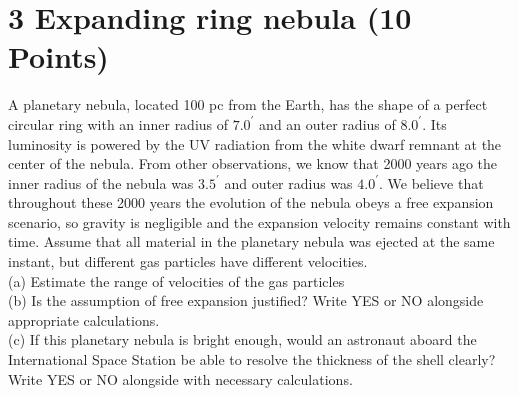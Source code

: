 \documentclass[10pt]{article}
\begin{document}
\section*{3 Expanding ring nebula (10 Points)}
A planetary nebula, located 100 pc from the Earth, has the shape of a perfect circular ring with an inner radius of $7.0^{\prime}$ and an outer radius of $8.0^{\prime}$. Its luminosity is powered by the UV radiation from the white dwarf remnant at the center of the nebula. From other observations, we know that 2000 years ago the inner radius of the nebula was $3.5^{\prime}$ and outer radius was $4.0^{\prime}$. We believe that throughout these 2000 years the evolution of the nebula obeys a free expansion scenario, so gravity is negligible and the expansion velocity remains constant with time. Assume that all material in the planetary nebula was ejected at the same instant, but different gas particles have different velocities.\\
(a) Estimate the range of velocities of the gas particles\\
(b) Is the assumption of free expansion justified? Write YES or NO alongside appropriate calculations.\\
(c) If this planetary nebula is bright enough, would an astronaut aboard the International Space Station be able to resolve the thickness of the shell clearly? Write YES or NO alongside with necessary calculations.
\end{document}
